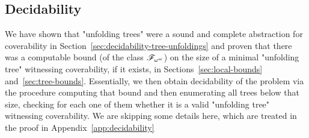 \subsection{Decidability}
\label{sec:decidability-end}

We have shown that "unfolding trees" were a sound and complete abstraction for coverability in Section~\ref{sec:decidability-tree-unfoldings} and proven that there was a computable bound (of the class $\mathscr{F}_{\omega^\omega}$) on the size of a minimal "unfolding tree" witnessing coverability, if it exists, in Sections~\ref{sec:local-bounds} and~\ref{sec:tree-bounds}. Essentially, we then obtain decidability of the problem via the procedure computing that bound and then enumerating all trees below that size, checking for each one of them whether it is a valid "unfolding tree" witnessing coverability. We are skipping some details here, which are treated in the proof in Appendix~\ref{app:decidability}

\decidablecover*


